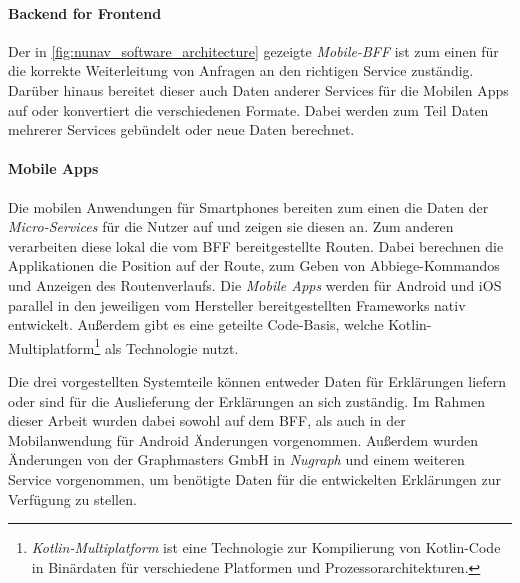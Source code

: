 \paragraph{Backend for Frontend} Der in \autoref{fig:nunav_software_architecture} gezeigte \textit{Mobile-BFF} ist zum einen für die korrekte Weiterleitung von Anfragen an den richtigen Service zuständig. Darüber hinaus bereitet dieser auch Daten anderer Services für die Mobilen Apps auf oder konvertiert die verschiedenen Formate. Dabei werden zum Teil Daten mehrerer Services gebündelt oder neue Daten berechnet. 

\paragraph{Mobile Apps} Die mobilen Anwendungen für Smartphones bereiten zum einen die Daten der \textit{Micro-Services} für die Nutzer auf und zeigen sie diesen an. Zum anderen verarbeiten diese lokal die vom BFF bereitgestellte Routen. Dabei berechnen die Applikationen die Position auf der Route, zum Geben von Abbiege-Kommandos und Anzeigen des Routenverlaufs. Die \textit{Mobile Apps} werden für Android und iOS parallel in den jeweiligen vom Hersteller bereitgestellten Frameworks nativ entwickelt. Außerdem gibt es eine geteilte Code-Basis, welche Kotlin-Multiplatform\footnote{\textit{Kotlin-Multiplatform} ist eine Technologie zur Kompilierung von Kotlin-Code in Binärdaten für verschiedene Platformen und Prozessorarchitekturen.} als Technologie nutzt.

\bigskip

Die drei vorgestellten Systemteile können entweder Daten für Erklärungen liefern oder sind für die Auslieferung der Erklärungen an sich zuständig. Im Rahmen dieser Arbeit wurden dabei sowohl auf dem BFF, als auch in der Mobilanwendung für Android Änderungen vorgenommen. Außerdem wurden Änderungen von der Graphmasters GmbH in \textit{Nugraph} und einem weiteren Service vorgenommen, um benötigte Daten für die entwickelten Erklärungen zur Verfügung zu stellen.